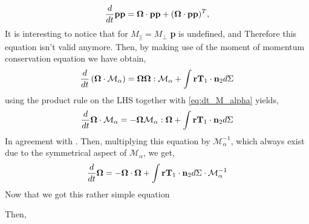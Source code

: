 \begin{equation}
    \frac{d}{d t} \textbf{pp} 
    = \mathbf{\Omega} \cdot \textbf{pp} +(\mathbf{\Omega} \cdot \textbf{pp})^T,
    \label{eq:dt_pp_alpha}
\end{equation}
It is interesting to notice that for $M_{||} = M_{\bot}$ \textbf{p} is undefined, and Therefore this equation isn't valid anymore. 
Then, by making use of the moment of momentum conservation equation we have obtain, 
\begin{equation}
    \frac{d}{d t} \left(
        \mathbf{\Omega}\cdot
        \mathcal{M}_\alpha
    \right)
    = \mathbf{\Omega}\mathbf{\Omega} : \mathcal{M}_\alpha + \int \textbf{rT}_1\cdot \textbf{n}_2 d\Sigma
\end{equation}
using the product rule on the LHS together with \ref{eq:dt_M_alpha} yields, 
\begin{equation}
    \frac{d}{d t} 
    \mathbf{\Omega}\cdot
    \mathcal{M}_\alpha
    = 
    - \mathbf{\Omega}\mathcal{M}_\alpha: \mathbf{\Omega}
    + \int \textbf{rT}_1\cdot \textbf{n}_2 d\Sigma
\end{equation}
In agreement with \cite{goldstein2002classical}. 
Then, multiplying this equation by $\mathcal{M}_\alpha^{-1}$, which always exist due to the symmetrical aspect of $\mathcal{M}_\alpha$, we get, 
\begin{equation}
    \frac{d}{d t} 
    \mathbf{\Omega}
    = 
    - \mathbf{\Omega}\cdot \mathbf{\Omega}
    + \int \textbf{rT}_1\cdot \textbf{n}_2 d\Sigma \cdot \mathcal{M}_\alpha^{-1}
\end{equation}
Now  that we got this rather simple equation  


Then, 
